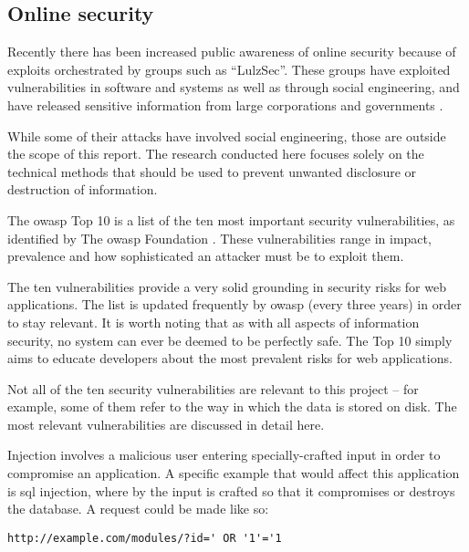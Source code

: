 
\subsection{Online security}
\label{sec:research_security}

Recently there has been increased public awareness of online security because
of exploits orchestrated by groups such as ``LulzSec''. These groups have
exploited vulnerabilities in software and systems as well as through social
engineering, and have released sensitive information from large corporations
and governments \cite{ASATrendsinDataBreaches_2012}.

While some of their attacks have involved social engineering, those are
outside the scope of this report. The research conducted here focuses solely
on the technical methods that should be used to prevent unwanted disclosure or
destruction of information.

The \gls{owasp} Top 10 is a list of the ten most important security
vulnerabilities, as identified by The \gls{owasp} Foundation
\cite{OWASPTop10_2010}. These vulnerabilities range in impact, prevalence and
how sophisticated an attacker must be to exploit them.

The ten vulnerabilities provide a very solid grounding in security risks for
web applications. The list is updated frequently by \gls{owasp} (every three
years) in order to stay relevant. It is worth noting that as with all aspects
of information security, no system can ever be deemed to be perfectly safe.
The Top 10 simply aims to educate developers about the most prevalent risks
for web applications.

Not all of the ten security vulnerabilities are relevant to this project --
for example, some of them refer to the way in which the data is stored on
disk. The most relevant vulnerabilities are discussed in detail here.


Injection involves a malicious user entering specially-crafted input in order
to compromise an application. A specific example that would affect this
application is \gls{sql} injection, where by the input is crafted so that it
compromises or destroys the database. A request could be made like so:

\begin{lstlisting}
http://example.com/modules/?id=' OR '1'='1
\end{lstlisting}

